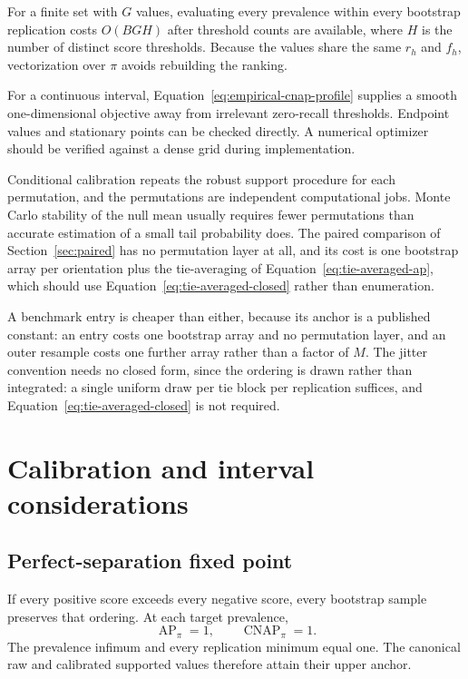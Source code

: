 \documentclass[11pt]{article}
\newcommand{\AP}{\operatorname{AP}}
\newcommand{\CNAP}{\operatorname{CNAP}}
\theoremstyle{remark}
\begin{document}
For a finite set with $G$ values, evaluating every prevalence within every bootstrap replication costs $O(BGH)$ after threshold counts are available, where $H$ is the number of distinct score thresholds. Because the values share the same $r_h$ and $f_h$, vectorization over $\pi$ avoids rebuilding the ranking.

For a continuous interval, Equation~\eqref{eq:empirical-cnap-profile} supplies a smooth one-dimensional objective away from irrelevant zero-recall thresholds. Endpoint values and stationary points can be checked directly. A numerical optimizer should be verified against a dense grid during implementation.

Conditional calibration repeats the robust support procedure for each permutation, and the permutations are independent computational jobs. Monte Carlo stability of the null mean usually requires fewer permutations than accurate estimation of a small tail probability does. The paired comparison of Section~\ref{sec:paired} has no permutation layer at all, and its cost is one bootstrap array per orientation plus the tie-averaging of Equation~\eqref{eq:tie-averaged-ap}, which should use Equation~\eqref{eq:tie-averaged-closed} rather than enumeration.

A benchmark entry is cheaper than either, because its anchor is a published constant: an entry costs one bootstrap array and no permutation layer, and an outer resample costs one further array rather than a factor of $M$. The jitter convention needs no closed form, since the ordering is drawn rather than integrated: a single uniform draw per tie block per replication suffices, and Equation~\eqref{eq:tie-averaged-closed} is not required.

\section{Calibration and interval considerations}
\label{app:calibration}

\subsection{Perfect-separation fixed point}

If every positive score exceeds every negative score, every bootstrap sample preserves that ordering. At each target prevalence,
\[
\AP_\pi=1,
\qquad
\CNAP_\pi=1.
\]
The prevalence infimum and every replication minimum equal one. The canonical raw and calibrated supported values therefore attain their upper anchor.
\end{document}
